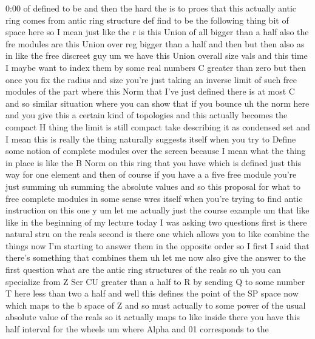\begin{unfinished}{0:00}
of  defined  to  be  and  then  the  hard  the
is  to  proes  that  this  actually  antic
ring  comes  from  antic  ring  structure  def
find  to  be  the  following
thing  bit  of  space  here  so  I  mean  just
like  the  r  is  this  Union  of  all  bigger
than  a  half  also  the  fre  modules  are
this  Union  over  reg  bigger  than  a
half  and
then  but  then  also  as  in  like  the  free
discreet  guy  um  we  have  this  Union
overall  size  vals  and  this  time  I  maybe
want  to  index  them  by  some  real  numbers
C  greater  than
zero  but  then  once  you  fix  the  radius
and  size  you're  just  taking  an  inverse
limit  of  such  free
modules
of  the  part  where  this  Norm  that  I've
just  defined  there  is  at  most
C  and  so  similar  situation  where  you  can
show  that  if  you
bounce  uh  the  norm  here  and  you  give
this  a  certain  kind  of  topologies  and
this  actually  becomes  the  compact  H
thing  the  limit  is  still  compact
take  describing  it  as  condensed
set  and  I  mean  this  is  really  the  thing
naturally  suggests  itself  when  you  try
to  Define  some  notion  of  complete
modules  over  the  screen  because  I  mean
what  the  thing  in  place  is  like  the  B
Norm  on  this  ring  that  you  have  which  is
defined  just  this  way  for  one  element
and  then  of  course  if  you  have  a  a  five
free  module  you're  just  summing  uh
summing  the  absolute
values  and  so  this  proposal  for  what  to
free  complete  modules  in  some  sense  wres
itself  when  you're  trying  to  find  antic
instruction  on  this
one
y
um  let  me  actually  just  the  course
example  um  that  like  like  in  the
beginning  of  my  lecture  today  I  was
asking  two  questions  first  is  there
natural  stru  on  the  reals  second  is
there  one  which  allows  you  to  like
combine  the  things  now  I'm  starting  to
answer  them  in  the  opposite  order  so  I
first  I  said  that  there's  something  that
combines  them  uh  let  me  now  also  give
the  answer  to  the  first  question  what
are  the  antic  ring  structures  of  the
reals
so  uh  you  can
specialize  from  Z  Ser  CU  greater  than  a
half  to
R  by  sending  Q  to  some  number  T  here
less  than  two  a
half  and
well  this
defines  the  point  of  the  SP
space  now  which  maps  to  the  b
space  of
Z  and  so  must  actually  to  some  power  of
the  usual  absolute  value  of  the  reals  so
it  actually  maps  to  like  inside  there
you  have  this  half  interval  for  the
wheels
um  where  Alpha  and  01  corresponds  to  the

\end{unfinished}
